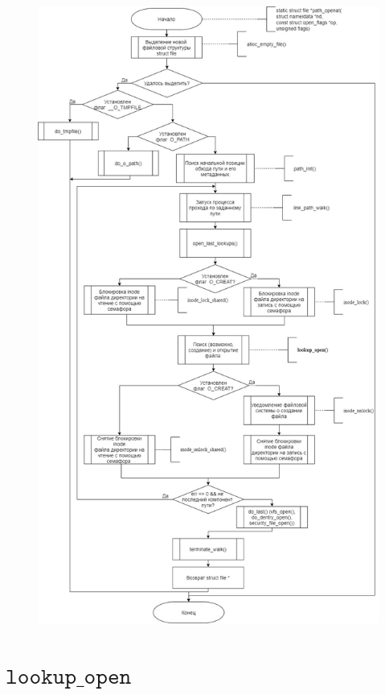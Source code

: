 \documentclass[a4paper,14pt]{extreport}
\begin{document}
\begin{figure}[H]
	\centering
	\includegraphics[scale=0.39]{img/path_openat.jpg}
	\label{fig:path_openat}
\end{figure}



\section{$\texttt{lookup\_open}$}
\end{document}
